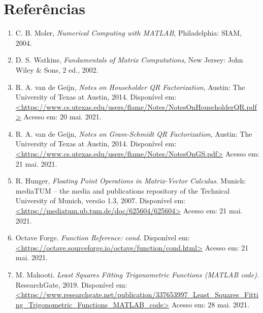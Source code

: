 \documentclass[a4paper, 12pt]{article}
\begin{document}
\section{Referências}
\begin{enumerate}
\sloppy
\item C. B. Moler, \textit{Numerical Computing with MATLAB}, Philadelphia: SIAM, 2004.
\item D. S. Watkins, \textit{Fundamentals of Matrix Computations}, New Jersey: John Wiley \& Sons, 2 ed., 2002.
\item R. A. van de Geijn, \textit{Notes on Householder QR Factorization}, Austin: The University of Texas at Austin, 2014. Disponível em: \url{<https://www.cs.utexas.edu/users/flame/Notes/NotesOnHouseholderQR.pdf>} Acesso em: 20 mai. 2021.
\item R. A. van de Geijn, \textit{Notes on Gram-Schmidt QR Factorization}, Austin: The University of Texas at Austin, 2014. Disponível em: \url{<https://www.cs.utexas.edu/users/flame/Notes/NotesOnGS.pdf>} Acesso em: 21 mai. 2021.
\item R. Hunger, \textit{Floating Point Operations in Matrix-Vector Calculus}. Munich: mediaTUM – the media and publications repository of the Technical University of Munich, versão 1.3, 2007. Disponível em: \url{<https://mediatum.ub.tum.de/doc/625604/625604>} Acesso em: 21 mai. 2021.
\item Octave Forge. \textit{Function Reference: cond}. Disponível em: \url{<https://octave.sourceforge.io/octave/function/cond.html>} Acesso em: 21 mai. 2021.
\item M. Mahooti. \textit{Least Squares Fitting Trigonometric Functions (MATLAB code)}. ResearchGate, 2019. Disponível em: \url{<https://www.researchgate.net/publication/337653997_Least_Squares_Fitting_Trigonometric_Functions_MATLAB_code>} Acesso em: 28 mai. 2021.
\end{enumerate}

\newpage
\end{document}
